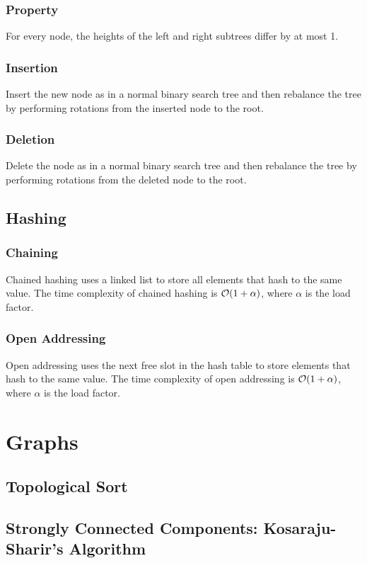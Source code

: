 \documentclass{article}
\begin{document}
\subsubsection{Property}
For every node, the heights of the left and right subtrees differ by at most 1.

\subsubsection{Insertion}
Insert the new node as in a normal binary search tree and then rebalance the tree by performing rotations from the inserted node to the root.

\subsubsection{Deletion}
Delete the node as in a normal binary search tree and then rebalance the tree by performing rotations from the deleted node to the root.

\subsection{Hashing}
\subsubsection{Chaining}
Chained hashing uses a linked list to store all elements that hash to the same value. The time complexity of chained hashing is $\mathcal{O}(1+\alpha)$, where $\alpha$ is the load factor.

\subsubsection{Open Addressing}
Open addressing uses the next free slot in the hash table to store elements that hash to the same value. The time complexity of open addressing is $\mathcal{O}(1+\alpha)$, where $\alpha$ is the load factor.


\section{Graphs}
\subsection{Topological Sort}


\subsection{Strongly Connected Components: Kosaraju-Sharir's Algorithm}

\end{document}
